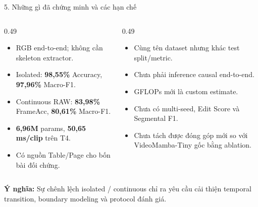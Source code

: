 \documentclass[aspectratio=169,9pt]{beamer}
\newcommand{\smallnote}[1]{{\fontsize{7.1}{8.4}\selectfont #1\par}}
\newcommand{\tightitems}{\setlength{\itemsep}{0.13em}\setlength{\parskip}{0pt}\setlength{\parsep}{0pt}}
\begin{document}
\begin{frame}{5. Những gì đã chứng minh và các hạn chế}
\begin{columns}[T,onlytextwidth]
\begin{column}{0.49\textwidth}
\begin{tcolorbox}[titlepanel,title=Kết quả đã có,height=4.65cm]
\begin{itemize}\tightitems
\item RGB end-to-end; không cần skeleton extractor.
\item Isolated: \textbf{98,55\%} Accuracy, \textbf{97,96\%} Macro-F1.
\item Continuous RAW: \textbf{83,98\%} FrameAcc, \textbf{80,61\%} Macro-F1.
\item \textbf{6,96M} params, \textbf{50,65 ms/clip} trên T4.
\item Có nguồn Table/Page cho bốn bài đối chứng.
\end{itemize}
\end{tcolorbox}
\end{column}
\begin{column}{0.49\textwidth}
\begin{tcolorbox}[titlepanel,title=Chưa đủ bằng chứng,height=4.65cm]
\begin{itemize}\tightitems
\item Cùng tên dataset nhưng khác test split/metric.
\item Chưa phải inference causal end-to-end.
\item GFLOPs mới là custom estimate.
\item Chưa có multi-seed, Edit Score và Segmental F1.
\item Chưa tách được đóng góp mới so với VideoMamba-Tiny gốc bằng ablation.
\end{itemize}
\end{tcolorbox}
\end{column}
\end{columns}
\vspace{0.15cm}
\smallnote{\textbf{Ý nghĩa:} Sự chênh lệch isolated / continuous chỉ ra yêu cầu cải thiện temporal transition, boundary modeling và protocol đánh giá.}
\end{frame}
\end{document}
